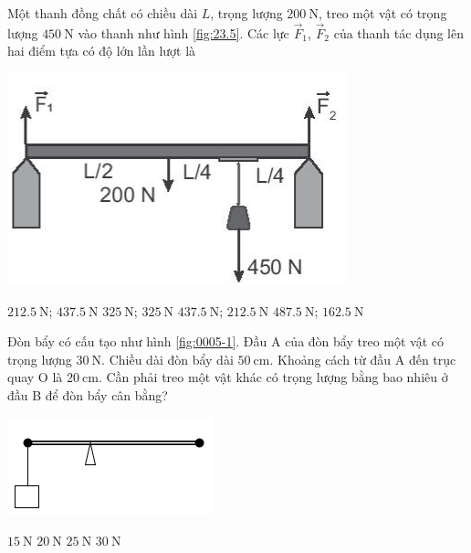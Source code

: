 \begin{ex}
	Một thanh đồng chất có chiều dài $L$, trọng lượng $\SI{200}{\newton}$, treo một vật có trọng lượng $\SI{450}{\newton}$ vào thanh như hình \ref{fig:23.5}. Các lực $\vec F_1$, $\vec F_2$ của thanh tác dụng lên hai điểm tựa có độ lớn lần lượt là
	\begin{center}
		\includegraphics[width=0.4\linewidth]{../figs/VN10-2022-PH-TP023-P-5}
		\label{fig:23.5}
	\end{center}
	\choice
	{\True $\SI{212.5}{\newton}$; $\SI{437.5}{\newton}$}
	{$\SI{325}{\newton}$; $\SI{325}{\newton}$}
	{$\SI{437.5}{\newton}$; $\SI{212.5}{\newton}$}
	{$\SI{487.5}{\newton}$; $\SI{162.5}{\newton}$}
\end{ex}
\begin{ex}
	Đòn bẩy có cấu tạo như hình \ref{fig:0005-1}. Đầu A của đòn bẩy treo một vật có trọng lượng $\SI{30}{\newton}$. Chiều dài đòn bẩy dài $\SI{50}{\centi\meter}$. Khoảng cách từ đầu A đến trục quay O là $\SI{20}{\centi\meter}$. Cần phải treo một vật khác có trọng lượng bằng bao nhiêu ở đầu B để đòn bẩy cân bằng?
	\begin{center}
		\includegraphics[width=0.35\linewidth]{../figs/VN10-2023-PH-TP0005-1}
		\label{fig:0005-1}
	\end{center}	
	\choice
	{$\SI{15}{\newton}$}
	{\True $\SI{20}{\newton}$}
	{$\SI{25}{\newton}$}
	{$\SI{30}{\newton}$}
\end{ex}

